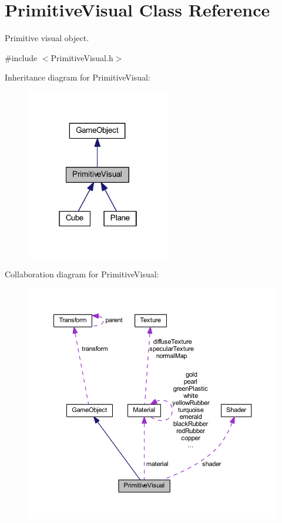 \hypertarget{class_primitive_visual}{}\section{Primitive\+Visual Class Reference}
\label{class_primitive_visual}


Primitive visual object.  




{\ttfamily \#include $<$Primitive\+Visual.\+h$>$}



Inheritance diagram for Primitive\+Visual\+:\nopagebreak
\begin{figure}[H]
\begin{center}
\leavevmode
\includegraphics[width=178pt]{class_primitive_visual__inherit__graph}
\end{center}
\end{figure}


Collaboration diagram for Primitive\+Visual\+:\nopagebreak
\begin{figure}[H]
\begin{center}
\leavevmode
\includegraphics[width=350pt]{class_primitive_visual__coll__graph}
\end{center}
\end{figure}
